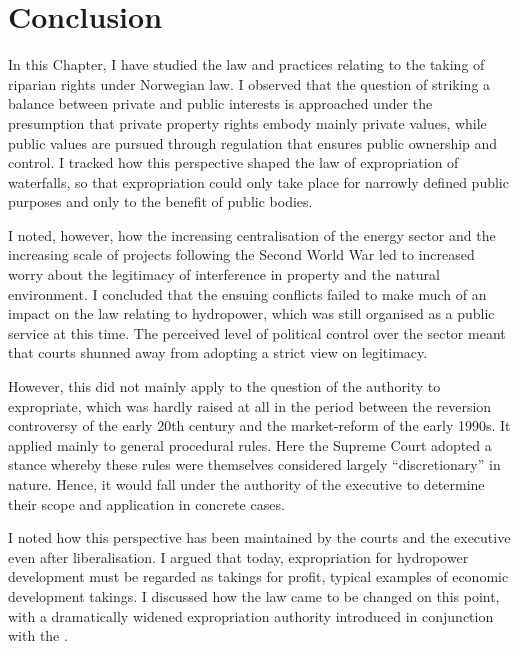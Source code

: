 \section{Conclusion}\label{conc}

In this Chapter, I have studied the law and practices relating to the taking of riparian rights under Norwegian law. I observed that the question of striking a balance between private and public interests is approached under the presumption that private property rights embody mainly private values, while public values are pursued through regulation that ensures public ownership and control. I tracked how this perspective shaped the law of expropriation of waterfalls, so that expropriation could only take place for narrowly defined public purposes and only to the benefit of public bodies.

I noted, however, how the increasing centralisation of the energy sector and the increasing scale of projects following the Second World War led to increased worry about the legitimacy of interference in property and the natural environment. I concluded that the ensuing conflicts failed to make much of an impact on the law relating to hydropower, which was still organised as a public service at this time. 
The perceived level of political control over the sector meant that courts shunned away from adopting a strict view on legitimacy. 

However, this did not mainly apply to the question of the authority to expropriate, which was hardly raised at all in the period between the reversion controversy of the early 20th century and the market-reform of the early 1990s. It applied mainly to general procedural rules. Here the Supreme Court adopted a stance whereby these rules were themselves considered largely ``discretionary'' in nature. Hence, it would fall under the authority of the executive to determine their scope and application in concrete cases.

I noted how this perspective has been maintained by the courts and the executive even after liberalisation. I argued that today, expropriation for hydropower development must be regarded as takings for profit, typical examples of economic development takings. I discussed how the law came to be changed on this point, with a dramatically widened expropriation authority introduced in conjunction with the \cite{wra00}.

